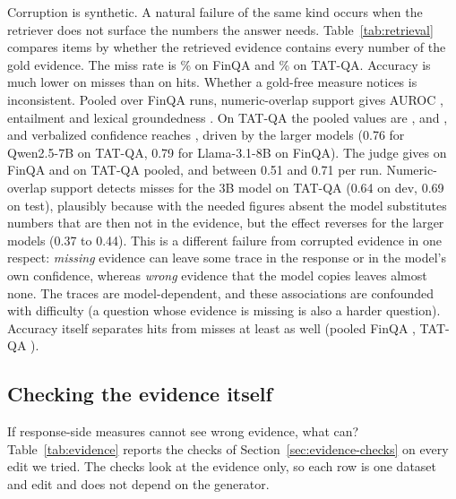 Corruption is synthetic.
A natural failure of the same kind occurs when the retriever does not surface the numbers the answer needs.
Table~\ref{tab:retrieval} compares items by whether the retrieved evidence contains every number of the gold evidence.
The miss rate is \missFin\% on FinQA and \missTat\% on TAT-QA.
Accuracy is much lower on misses than on hits.
Whether a gold-free measure notices is inconsistent.
Pooled over FinQA runs, numeric-overlap support gives AUROC \retFinoverlap{}, entailment \retFinnli{} and lexical groundedness \retFinlexical{}.
On TAT-QA the pooled values are \retTatoverlap{}, \retTatnli{} and \retTatlexical{}, and verbalized confidence reaches \retTatconf{}, driven by the larger models (0.76 for Qwen2.5-7B on TAT-QA, 0.79 for Llama-3.1-8B on FinQA).
The judge gives \retFinjudge{} on FinQA and \retTatjudge{} on TAT-QA pooled, and between 0.51 and 0.71 per run.
Numeric-overlap support detects misses for the 3B model on TAT-QA (0.64 on dev, 0.69 on test), plausibly because with the needed figures absent the model substitutes numbers that are then not in the evidence, but the effect reverses for the larger models (0.37 to 0.44).
This is a different failure from corrupted evidence in one respect: \emph{missing} evidence can leave some trace in the response or in the model's own confidence, whereas \emph{wrong} evidence that the model copies leaves almost none.
The traces are model-dependent, and these associations are confounded with difficulty (a question whose evidence is missing is also a harder question).
Accuracy itself separates hits from misses at least as well (pooled FinQA \retFincorrect{}, TAT-QA \retTatcorrect{}).

\begin{table}[t]
\centering\small
\resizebox{\textwidth}{!}{}
\caption{Items split by whether the retrieved evidence contains every number of the gold evidence (FinQA: annotated gold facts; TAT-QA: operands of the annotated derivation). AUROC: can the measure tell complete from incomplete retrieved evidence? $^\dagger$ needs the gold answer.}
\label{tab:retrieval}
\end{table}

\subsection{Checking the evidence itself}
\label{sec:res-evidence}

If response-side measures cannot see wrong evidence, what can? Table~\ref{tab:evidence} reports the checks of Section~\ref{sec:evidence-checks} on every edit we tried. The checks look at the evidence only, so each row is one dataset and edit and does not depend on the generator.

